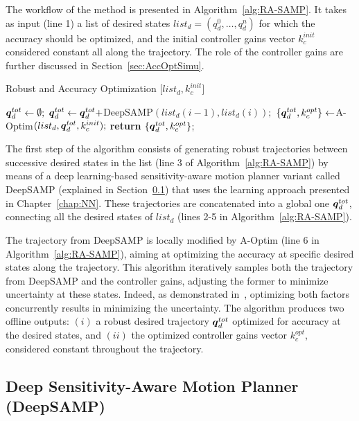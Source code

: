 The workflow of the method is presented in Algorithm~\ref{alg:RA-SAMP}. 
It takes as input (line 1) a list of desired states $list_{d} = (q_{d}^0, \dots, q_{d}^n)$ for which the accuracy should be optimized, and the initial controller gains vector $k_{c}^{init}$ considered constant all along the trajectory.
The role of the controller gains are further discussed in Section~\ref{sec:AccOptSimu}.

\begin{algorithm}[htp]
\caption{Robust and Accuracy Optimization [$list_{d}, k_{c}^{init}$]}\label{alg:RA-SAMP}
\begin{algorithmic}[1]
\State $\boldsymbol{q}_d^{tot} \gets \emptyset;$
    \State $\boldsymbol{q}_d^{tot} \gets \boldsymbol{q}_d^{tot} + $DeepSAMP$(list_{d}(i-1),list_{d}(i));$
\EndFor
\State $\left \{ \boldsymbol{q}_d^{tot}, k_{c}^{opt} \right \} \gets $A-Optim$(list_{d},\boldsymbol{q}_d^{tot}, k_{c}^{init});$
\State \textbf{return} $\left \{ \boldsymbol{q}_d^{tot}, k_{c}^{opt}  \right \}$;
\end{algorithmic}
\end{algorithm}

The first step of the algorithm consists of generating robust trajectories between successive desired states in the list (line 3 of Algorithm~\ref{alg:RA-SAMP}) by means of a deep learning-based sensitivity-aware motion planner variant called DeepSAMP (explained in Section~\ref{sec:RSAMP}) that uses the learning approach presented in Chapter~\ref{chap:NN}.
These trajectories are concatenated into a global one $\boldsymbol{q}_d^{tot}$, connecting all the desired states of $list_{d}$ (lines 2-5 in Algorithm~\ref{alg:RA-SAMP}). 

The trajectory from DeepSAMP is locally modified by A-Optim (line 6 in Algorithm~\ref{alg:RA-SAMP}), aiming at optimizing the accuracy at specific desired states along the trajectory. 
This algorithm iteratively samples both the trajectory from DeepSAMP and the controller gains, adjusting the former to minimize uncertainty at these states. 
Indeed, as demonstrated in~\cite{AliIROS}, optimizing both factors concurrently results in minimizing the uncertainty.
The algorithm produces two offline outputs: $(i)$ a robust desired trajectory $\boldsymbol{q}_d^{tot}$ optimized for accuracy at the desired states, and $(ii)$ the optimized controller gains vector $k_{c}^{opt}$, considered constant throughout the trajectory.

\subsection{Deep Sensitivity-Aware Motion Planner (DeepSAMP)}\label{sec:RSAMP}

